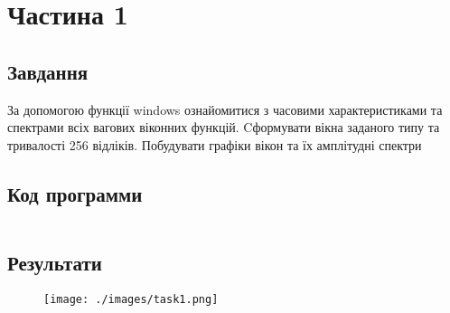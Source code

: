 \section{Частина 1}
\label{sec:task1}

\subsection{Завдання}
\label{subsec:task1_task}

За допомогою функції windows ознайомитися з часовими
характеристиками та спектрами всіх вагових віконних функцій.
Cформувати вікна заданого типу та тривалості 256 відліків.
Побудувати графіки вікон та їх амплітудні спектри

\subsection{Код программи}
\label{subsec:task1_code}
\inputminted{python}{../src/task1.py}

\subsection{Результати}
\label{subsec:task1_results}

\begin{figure}[!ht]
    \centering
    \texttt{[image: ./images/task1.png]}
\end{figure}
